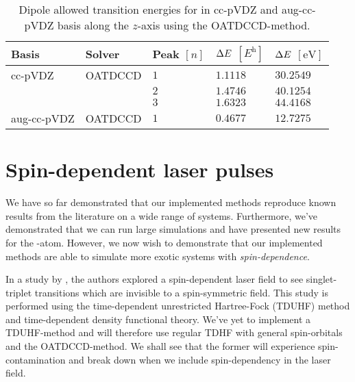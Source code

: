         \begin{table}
            \centering
            \caption{Dipole allowed transition energies for  in cc-pVDZ
            and aug-cc-pVDZ basis along the $z$-axis using the OATDCCD-method.}
            \renewcommand{\arraystretch}{1.3}
            \begin{tabular}{@{}lllll@{}}
                \toprule
                Basis & Solver & Peak $[n]$
                & $\Delta E$ $[\si{\hartree}]$
                & $\Delta E$ $[\si{\electronvolt}]$
                \\
                \midrule
                cc-pVDZ & OATDCCD & $1$ & $1.1118$ & $30.2549$ \\
                & & $2$ & $1.4746$ & $40.1254$ \\
                & & $3$ & $1.6323$ & $44.4168$ \\
                aug-cc-pVDZ & OATDCCD & $1$ & $0.4677$ & $12.7275$ \\
                \bottomrule
            \end{tabular}
            \label{tab:dipole-ar}
        \end{table}

    \section{Spin-dependent laser pulses}
        \label{sec:isborn}
        We have so far demonstrated that our implemented methods reproduce known
        results from the literature on a wide range of systems.
        Furthermore, we've demonstrated that we can run large simulations and
        have presented new results for the -atom.
        However, we now wish to demonstrate that our implemented methods are
        able to simulate more exotic systems with \emph{spin-dependence}.

        In a study by \citeauthor{isborn} \cite{isborn}, the authors explored a
        spin-dependent laser field to see singlet-triplet transitions which are
        invisible to a spin-symmetric field.
        This study is performed using the time-dependent unrestricted
        Hartree-Fock (TDUHF) method and time-dependent density functional theory.
        We've yet to implement a TDUHF-method and will therefore use regular
        TDHF with general spin-orbitals and the OATDCCD-method.
        We shall see that the former will experience spin-contamination and
        break down when we include spin-dependency in the laser field.

